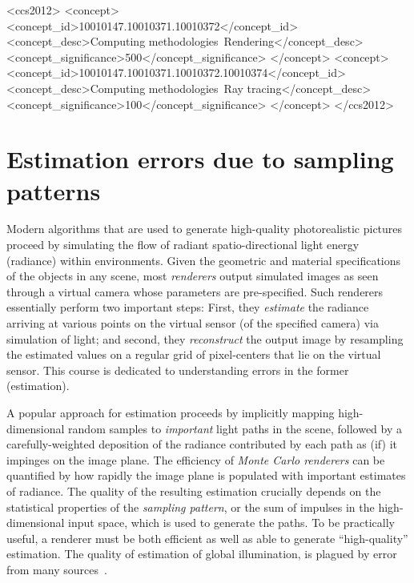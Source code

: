 \documentclass{acmsiggraph}
\begin{document}
%
%
\begin{CCSXML}
<ccs2012>
<concept>
<concept_id>10010147.10010371.10010372</concept_id>
<concept_desc>Computing methodologies~Rendering</concept_desc>
<concept_significance>500</concept_significance>
</concept>
<concept>
<concept_id>10010147.10010371.10010372.10010374</concept_id>
<concept_desc>Computing methodologies~Ray tracing</concept_desc>
<concept_significance>100</concept_significance>
</concept>
</ccs2012>
\end{CCSXML}

%
%


\keywordlist

\conceptlist

\printcopyright

\section{Estimation errors due to sampling patterns}
Modern algorithms that are used to generate high-quality photorealistic pictures proceed by simulating the flow of radiant spatio-directional light energy (radiance) within environments. Given the geometric and material specifications of the objects in any scene, most \textit{renderers} output simulated images as seen through a virtual camera whose parameters are pre-specified. Such renderers essentially perform two important steps: First, they \textit{estimate} the radiance arriving at various points on the virtual sensor (of the specified camera) via simulation of light; and second, they \textit{reconstruct} the output image by resampling the estimated values on a regular grid of pixel-centers that lie on the virtual sensor. This course is dedicated to understanding errors in the former (estimation).

A popular approach for estimation proceeds by implicitly mapping high-dimensional random samples to \textit{important} light paths in the scene, followed by a carefully-weighted deposition of the radiance contributed by each path as (if) it impinges on the image plane. The efficiency of \textit {Monte Carlo renderers} can be quantified by how rapidly the image plane is populated with important estimates of radiance. The quality of the resulting estimation crucially depends on the statistical properties of the \textit {sampling pattern}, or the sum of impulses in the high-dimensional input space, which is used to generate the paths. To be practically useful, a renderer must be both efficient as well as able to generate ``high-quality'' estimation. The quality of estimation of global illumination, is plagued by error from many sources~\cite{arvo1994framework}. 
\end{document}
